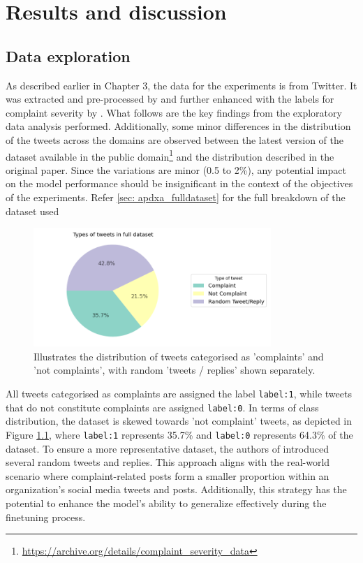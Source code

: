 \chapter{Results and discussion}

\section{Data exploration}
As described earlier in Chapter 3, the data for the experiments is from Twitter. It was extracted and pre-processed by \cite{preotiuc-pietro_automatically_2019} and further enhanced with the labels for complaint severity by \cite{jinModelingSeverityComplaints2021}. What follows are the key findings from the exploratory data analysis performed. Additionally, some minor differences in the distribution of the tweets across the domains are observed between the latest version of the dataset available in the public domain\footnote{\url{https://archive.org/details/complaint_severity_data}} and the distribution described in the original paper. Since the variations are minor (0.5 to 2\%), any potential impact on the model performance should be insignificant in the context of the objectives of the experiments. Refer \ref{sec: apdxa_fulldataset} for the full breakdown of the dataset used 


\begin{figure}[htb]
    \centering
    \includegraphics[width=9cm]{figures/compl_non_random_dist.png}
    \vspace*{-3mm}
    \caption{Illustrates the distribution of tweets categorised as 'complaints' and 'not complaints', with random 'tweets / replies' shown separately.}
    \label{fig: compl_non_random_dist}
\end{figure}


All tweets categorised as complaints are assigned the label \texttt{label:1}, while tweets that do not constitute complaints are assigned \texttt{label:0}. In terms of class distribution, the dataset is skewed towards 'not complaint' tweets, as depicted in Figure \ref{fig: compl_non_random_dist}, where \texttt{label:1} represents 35.7\% and \texttt{label:0} represents 64.3\% of the dataset. To ensure a more representative dataset, the authors of \cite{preotiuc-pietro_automatically_2019} introduced several random tweets and replies. This approach aligns with the real-world scenario where complaint-related posts form a smaller proportion within an organization's social media tweets and posts. Additionally, this strategy has the potential to enhance the model's ability to generalize effectively during the finetuning process.\\

